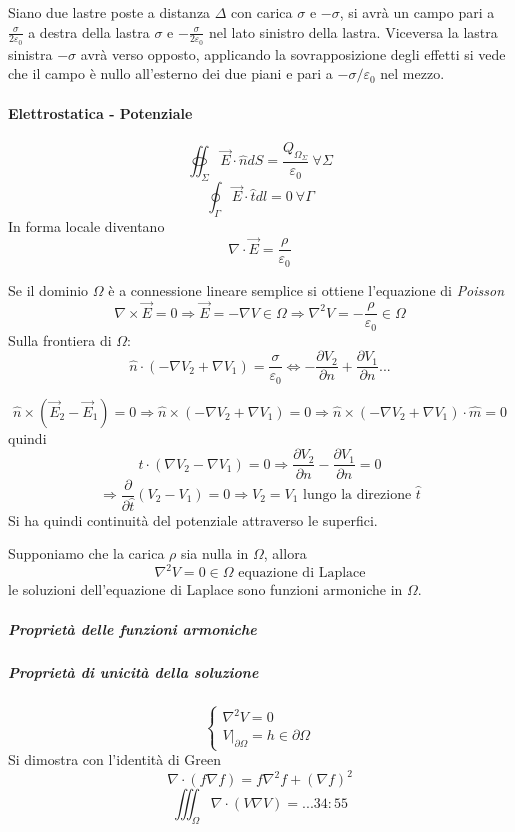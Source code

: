 Siano due lastre poste a distanza $\Delta$ con carica $\sigma$ e $-\sigma$,
si avrà un campo pari a $\frac{\sigma}{2\varepsilon_0}$ a destra della
lastra $\sigma$ e $-\frac{\sigma}{2\varepsilon_0}$ nel lato sinistro della lastra.
Viceversa la lastra sinistra $-\sigma$ avrà verso opposto, applicando la sovrapposizione degli 
effetti si vede che il campo è nullo all'esterno dei due piani e pari a $-\sigma/\varepsilon_0$ 
nel mezzo.

\paragraph{Elettrostatica - Potenziale}
$$
\oiint_\Sigma \vec{E}\cdot\hat{n} dS = \frac{Q_{\Omega_\Sigma}}{\varepsilon_0}\ \forall\Sigma
$$
$$
\oint_\Gamma \vec{E}\cdot\hat{t} dl =0\ \forall \Gamma
$$
In forma locale diventano
$$
\nabla\cdot\vec{E} = \frac{\rho}{\varepsilon_0}
$$

Se il dominio $\Omega$ è a connessione lineare semplice si ottiene l'equazione di \textit{Poisson}
$$
\nabla\times\vec{E} = 0 \Rightarrow \vec{E} = - \nabla V \in \Omega \Rightarrow \nabla^2V = -\frac{\rho}{\varepsilon_0} \in \Omega
$$
Sulla frontiera di $\Omega$:
$$
\hat{n}\cdot\left(-\nabla V_2 + \nabla V_1\right) = \frac{\sigma}{\varepsilon_0} \Leftrightarrow
-\frac{\partial V_2}{\partial n} + \frac{\partial V_1}{\partial n}...
$$


$$
\hat{n}\times\left(\vec{E}_2-\vec{E}_1\right) = 0 \Rightarrow \hat{n}\times\left(-\nabla V_2 + \nabla V_1\right) = 0 \Rightarrow \hat{n}\times\left(-\nabla V_2 + \nabla V_1\right)\cdot\hat{m} = 0
$$
quindi
$$
\hat{t}\cdot\left(\nabla V_2 - \nabla V_1\right) = 0 \Rightarrow \frac{\partial V_2}{\partial n} - \frac{\partial V_1}{\partial n} = 0
$$
$$
\Rightarrow \frac{\partial}{\partial \hat{t}}(V_2-V_1) = 0 \Rightarrow V_2 = V_1
\text{ lungo la direzione }\hat{t}
$$
Si ha quindi continuità del potenziale attraverso le superfici.

Supponiamo che la carica $\rho$ sia nulla in $\Omega$, allora
$$
\nabla^2 V = 0 \in \Omega \text{ equazione di Laplace}
$$
le soluzioni dell'equazione di Laplace sono funzioni armoniche in $\Omega$.

\subparagraph{Proprietà delle funzioni armoniche}

\subparagraph{Proprietà di unicità della soluzione}
$$
\begin{cases}
\nabla^2 V = 0\\
\left.V\right|_{\partial\Omega} = h \in \partial\Omega
\end{cases}
$$
Si dimostra con l'identità di Green
$$
\nabla\cdot(f\nabla f) = f\nabla^2f + (\nabla f)^2
$$
$$
\iiint_\Omega \nabla\cdot(V\nabla V) = ... 34:55
$$

